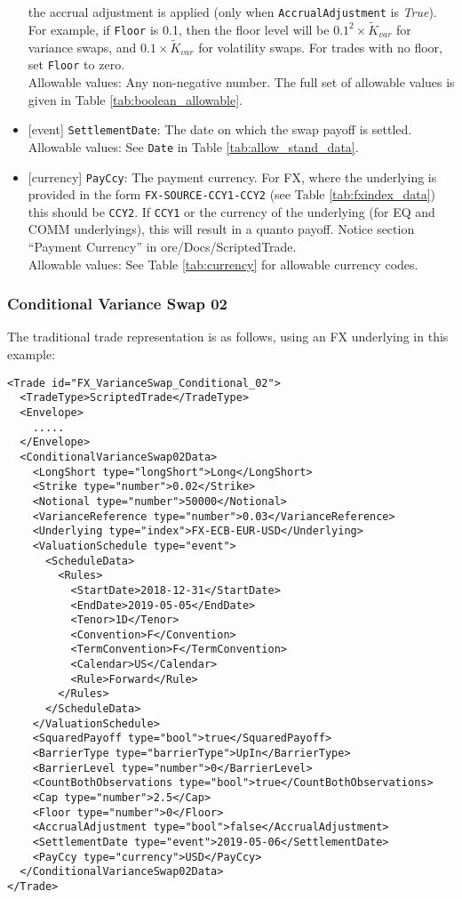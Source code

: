 \begin{itemize}
  the accrual adjustment is applied (only when \lstinline!AccrualAdjustment! is \emph{True}). For example,
  if \lstinline!Floor! is 0.1, then the floor level will be $0.1^2 \times \widetilde{K}_{var}$ for variance swaps, and
  $0.1 \times \widetilde{K}_{var}$ for volatility swaps. For trades with no floor, set
  \lstinline!Floor! to zero. \\
  Allowable values: Any non-negative number.
  The full set of allowable values is given in Table \ref{tab:boolean_allowable}.
  \item{}[event] \lstinline!SettlementDate!: The date on which the swap payoff is settled. \\
  Allowable values: See \lstinline!Date! in Table \ref{tab:allow_stand_data}.
  \item{}[currency] \lstinline!PayCcy!: The payment currency. For FX, where the underlying is provided
      in the form \lstinline!FX-SOURCE-CCY1-CCY2! (see Table \ref{tab:fxindex_data}) this should
      be \lstinline!CCY2!. If \lstinline!CCY1! or the currency of the underlying (for EQ and
      COMM underlyings), this will result in a quanto payoff. Notice section ``Payment Currency'' in ore/Docs/ScriptedTrade. \\
        Allowable values: See Table \ref{tab:currency} for allowable currency codes.
\end{itemize}

\subsubsection*{Conditional Variance Swap 02}

The traditional trade representation is as follows, using an FX underlying in this example:

\begin{verbatim}
<Trade id="FX_VarianceSwap_Conditional_02">
  <TradeType>ScriptedTrade</TradeType>
  <Envelope>
    .....
  </Envelope>
  <ConditionalVarianceSwap02Data>
    <LongShort type="longShort">Long</LongShort>
    <Strike type="number">0.02</Strike>
    <Notional type="number">50000</Notional>
    <VarianceReference type="number">0.03</VarianceReference>
    <Underlying type="index">FX-ECB-EUR-USD</Underlying>
    <ValuationSchedule type="event">
      <ScheduleData>
        <Rules>
          <StartDate>2018-12-31</StartDate>
          <EndDate>2019-05-05</EndDate>
          <Tenor>1D</Tenor>
          <Convention>F</Convention>
          <TermConvention>F</TermConvention>
          <Calendar>US</Calendar>
          <Rule>Forward</Rule>
        </Rules>
      </ScheduleData>
    </ValuationSchedule>
    <SquaredPayoff type="bool">true</SquaredPayoff>
    <BarrierType type="barrierType">UpIn</BarrierType>
    <BarrierLevel type="number">0</BarrierLevel>
    <CountBothObservations type="bool">true</CountBothObservations>
    <Cap type="number">2.5</Cap>
    <Floor type="number">0</Floor>
    <AccrualAdjustment type="bool">false</AccrualAdjustment>
    <SettlementDate type="event">2019-05-06</SettlementDate>
    <PayCcy type="currency">USD</PayCcy>
  </ConditionalVarianceSwap02Data>
</Trade>
\end{verbatim}

